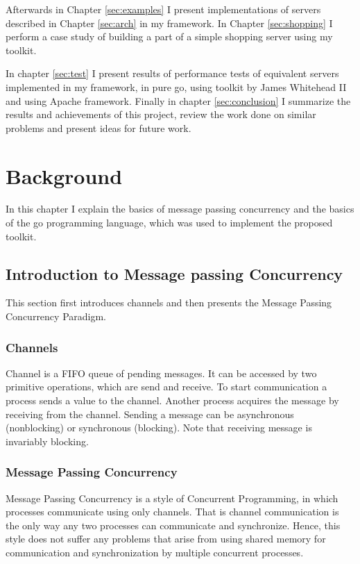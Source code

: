 \documentclass[12pt,a4paper]{article}
\begin{document}
Afterwards in Chapter \ref{sec:examples} I present
implementations of servers described in Chapter \ref{sec:arch} in my framework.
In Chapter \ref{sec:shopping} I perform a case study of building
a part of a simple shopping server using my toolkit.

In chapter \ref{sec:test} I present results of performance tests of equivalent 
servers implemented in my framework, in pure go, using toolkit by James Whitehead II
\cite{whitehead} and using Apache framework. Finally in chapter 
\ref{sec:conclusion} I summarize the results and achievements of this 
project, review the work done on similar problems and present ideas for future work.

\section{Background}
\label{sec:background}
In this chapter I explain the basics of message passing concurrency and 
the basics of the go programming language, which was used to implement 
the proposed toolkit.

\subsection{Introduction to Message passing Concurrency}
This section first introduces channels and then presents the Message
Passing Concurrency Paradigm.

\subsubsection{Channels}
Channel is a FIFO queue of pending messages. It can be accessed by two
primitive operations, which are send and receive. To start communication
a process sends a value to the channel. Another process acquires the message
by receiving from the channel. Sending a message can be asynchronous (nonblocking)
or synchronous (blocking). Note that receiving message is invariably blocking.
\cite[293]{book:foundations}

\subsubsection{Message Passing Concurrency}
Message Passing Concurrency is a style of Concurrent Programming, in which
processes communicate using only channels. That is channel communication is 
the only way any two processes can communicate and synchronize. 
Hence, this style does not 
suffer any problems that arise from using shared memory for communication 
and synchronization by multiple concurrent processes.
\end{document}
